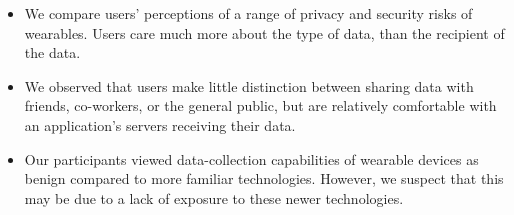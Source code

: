 \begin{itemize} \itemsep1pt \parskip0pt 
\item We compare users' perceptions of a range of privacy and security risks of wearables. Users care much more about the type of data, than the recipient of the data.
\item We observed that users make little distinction between sharing data with friends, co-workers, or the general public, but are relatively comfortable with an application's servers receiving their data.
\item Our participants viewed data-collection capabilities of wearable devices as benign compared to more familiar technologies. However, we suspect that this may be due to a lack of exposure to these newer technologies.
\end{itemize}